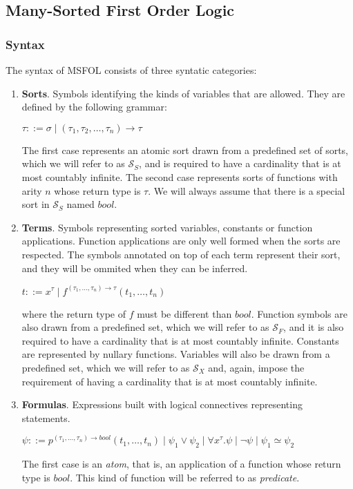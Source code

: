 \subsection{Many-Sorted First Order Logic}\label{sec:msfolHere}
\subsubsection{Syntax}

The syntax of MSFOL consists of three syntatic categories:

\begin{enumerate}
  \item \textbf{Sorts}. Symbols identifying the kinds of variables that are allowed. They are defined by the following grammar:
        \begin{center}
          $ \tau ::= \sigma \mid (\tau_{1}, \tau_{2}, \ldots, \tau_{n}) \rightarrow \tau$ %
        \end{center}
        The first case represents an atomic sort drawn from a predefined set of sorts, which we will refer to as $\mathcal{S}_{S}$, and is required to have a cardinality that is at most countably infinite. The second case represents sorts of functions with arity $n$ whose return type is $\tau$. We will always assume that there is a special sort in $\mathcal{S}_{S}$ named $\textit{bool}$.
  \item \textbf{Terms}. Symbols representing sorted variables, constants or function applications. Function applications are only well formed when the sorts are respected. The symbols annotated on top of each term represent their sort, and they will be ommited when they can be inferred.
        \begin{center}
          $ t ::= x^{\tau} \mid f^{(\tau_{1}, \ldots, \tau_{n}) \rightarrow \tau}(t_{1}, \dots, t_{n}) $
        \end{center}
        where the return type of $f$ must be different than $bool$. Function symbols are also drawn from a predefined set, which we will refer to as $\mathcal{S}_{F}$, and it is also
        required to have a cardinality that is at most countably infinite. Constants are represented by nullary functions.
        Variables will also be drawn from a predefined set, which we will refer to as $\mathcal{S}_{X}$ and, again, impose the requirement of having a cardinality that is at most countably infinite.
  \item \textbf{Formulas}. Expressions built with logical connectives representing statements.
        \begin{center}
          $ \psi ::= p^{(\tau_{1}, \dots, \tau_{n}) \rightarrow bool}(t_{1}, \dots, t_{n}) \mid \psi_{1} \vee \psi_{2} \mid \forall x^{\tau}.\psi \mid \neg \psi \mid \psi_{1} \simeq \psi_{2}$
        \end{center}
        The first case is an \textit{atom}, that is, an application of a function whose return type is $bool$. This
        kind of function will be referred to as \textit{predicate}.
\end{enumerate}

